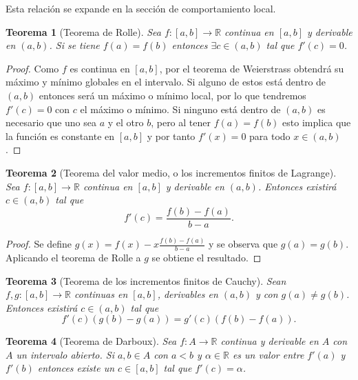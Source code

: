 \documentclass{article}
\newtheorem{theorem}{Teorema}
\newcommand{\reales}{\mathbb{R}}
\begin{document}
Esta relación se expande en la sección de comportamiento local.

\begin{theorem}[Teorema de Rolle]
	Sea $f: [a, b] \rightarrow \reales$ continua en $[a, b]$ y derivable en $(a, b)$. Si se tiene $f(a) = f(b)$ entonces $\exists c \in (a, b)$ tal que $f'(c) = 0$.
\end{theorem}
\begin{proof}
	Como $f$ es continua en $[a, b]$, por el teorema de Weierstrass obtendrá su máximo y mínimo globales en el intervalo. Si alguno de estos está dentro de $(a, b)$ entonces será un máximo o mínimo local, por lo que tendremos $f'(c) = 0$ con $c$ el máximo o mínimo. Si ninguno está dentro de $(a, b)$ es necesario que uno sea $a$ y el otro $b$, pero al tener $f(a) = f(b)$ esto implica que la función es constante en $[a, b]$ y por tanto $f'(x) = 0$ para todo $x \in (a, b)$.
\end{proof}

\begin{theorem}[Teorema del valor medio, o los incrementos finitos de Lagrange]
	Sea $f: [a, b] \rightarrow \reales$ continua en $[a, b]$ y derivable en $(a, b)$. Entonces existirá $c \in (a, b)$ tal que
	\begin{equation*}
		f'(c) = \frac{f(b) - f(a)}{b - a}.
	\end{equation*}
\end{theorem}
\begin{proof}
	Se define $g(x) = f(x) - x\frac{f(b) - f(a)}{b - a}$ y se observa que $g(a) = g(b)$. Aplicando el teorema de Rolle a $g$ se obtiene el resultado.
\end{proof}

\begin{theorem}[Teorema de los incrementos finitos de Cauchy]
	Sean $f,g: [a, b] \rightarrow \reales$ continuas en $[a, b]$, derivables en $(a, b)$ y con $g(a) \neq g(b)$. Entonces existirá $c \in (a, b)$ tal que
	\begin{equation*}
		f'(c)(g(b) - g(a)) = g'(c)(f(b) - f(a)).
	\end{equation*}
\end{theorem}

\begin{theorem}[Teorema de Darboux]
	Sea $f:A \rightarrow \reales$ continua y derivable en $A$ con $A$ un intervalo abierto. Si $a,b \in A$ con $a<b$ y $\alpha \in \reales$ es un valor entre $f'(a)$ y $f'(b)$ entonces existe un $c \in [a, b]$ tal que $f'(c) = \alpha$.
\end{theorem}
\end{document}
